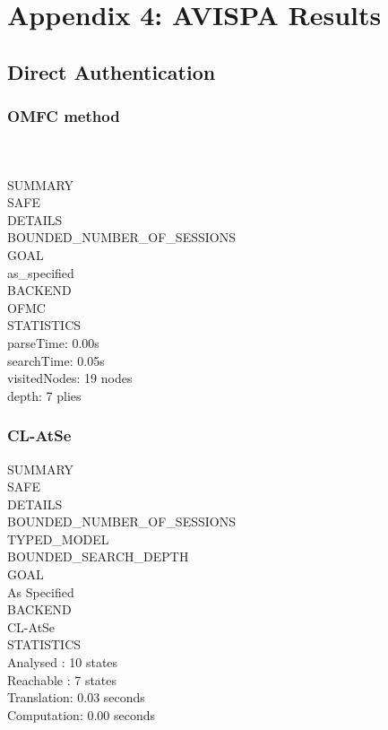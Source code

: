\chapter{Appendix 4: AVISPA Results}
\label{appendix:AVISPA_results}

\section{Direct Authentication}

\subsection{OMFC method}
\color{lstgrey}{\% OFMC}\\
\color{lstgrey}{\% Version of 2006/02/13}\\
\color{black}
SUMMARY\\
SAFE\\
\linebreak
DETAILS\\
BOUNDED\_NUMBER\_OF\_SESSIONS\\
\linebreak
GOAL\\
as\_specified\\
\linebreak
BACKEND\\
OFMC\\
\linebreak
STATISTICS\\
parseTime: 0.00s\\
searchTime: 0.05s\\
visitedNodes: 19 nodes\\
depth: 7 plies\\

\subsection{CL-AtSe}
SUMMARY\\
SAFE\\
\linebreak
DETAILS\\
BOUNDED\_NUMBER\_OF\_SESSIONS\\
TYPED\_MODEL\\
BOUNDED\_SEARCH\_DEPTH \\
\linebreak
GOAL\\
As Specified\\
\linebreak
BACKEND\\
CL-AtSe\\
\linebreak
STATISTICS\\
Analysed   : 10 states\\
Reachable  : 7 states\\
Translation: 0.03 seconds\\
Computation: 0.00 seconds\\

